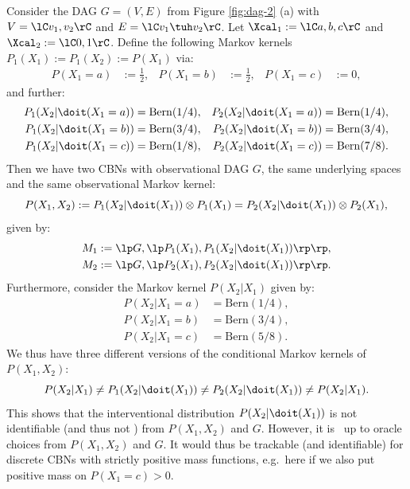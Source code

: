 \begin{Eg}
    Consider the DAG $G=(V,E)$ from Figure \ref{fig:dag-2} (a) with $V=\lC v_1,v_2 \rC$ and $E=\lC v_1\tuh v_2 \rC$.
    Let $\Xcal_{1}:=\lC a,b,c\rC$ and $\Xcal_{2}:=\lC 0,1 \rC$.
    Define the following Markov kernels $P_1(X_{1}) := P_1(X_{2}):=P(X_{1})$ via:
    \begin{align*}
        P(X_{1}=a) &:= \frac{1}{2}, &P(X_{1}=b) &:= \frac{1}{2}, & P(X_{1}=c) &:= 0,
    \end{align*}
    and further:
   \begin{align*}
        P_1(X_{2}|\doit(X_{1}=a)) & =  \mathrm{Bern}(1/4), & P_2(X_{2}|\doit(X_{1}=a)) & =  \mathrm{Bern}(1/4), \\
        P_1(X_{2}|\doit(X_{1}=b)) & =  \mathrm{Bern}(3/4), & P_2(X_{2}|\doit(X_{1}=b)) & =  \mathrm{Bern}(3/4), \\
        P_1(X_{2}|\doit(X_{1}=c)) & =  \mathrm{Bern}(1/8), & P_2(X_{2}|\doit(X_{1}=c)) & =  \mathrm{Bern}(7/8).
    \end{align*}
    Then we have two CBNs with observational DAG $G$, the same underlying spaces 
    and the same observational Markov kernel: 
    \[ P(X_{1},X_{2}) := P_1(X_{2}|\doit(X_{1})) \otimes P_1(X_{1}) = P_2(X_{2}|\doit(X_{1})) \otimes P_2(X_{1}), \]
    given by:
\begin{align*} M_1:=\lp G, \lp P_1(X_{1}),P_1(X_{2}|\doit(X_{1})) \rp \rp, \\
               M_2:=\lp G, \lp P_2(X_{1}),P_2(X_{2}|\doit(X_{1})) \rp \rp. 
\end{align*}
    Furthermore, consider the Markov kernel $P(X_{2}|X_{1})$ given by:
   \begin{align*}
        P(X_{2}|X_{1}=a) & =  \mathrm{Bern}(1/4),\\
        P(X_{2}|X_{1}=b) & =  \mathrm{Bern}(3/4), \\
        P(X_{2}|X_{1}=c) & =  \mathrm{Bern}(5/8).
    \end{align*}
    We thus have three different versions of the conditional Markov kernels of $P(X_{1},X_{2})$: 
 \[ P(X_{2}|X_{1}) \neq P_1(X_{2}|\doit(X_{1})) \neq P_2(X_{2}|\doit(X_{1})) \neq P(X_{2}|X_{1}). \]
 This shows that the interventional distribution $P(X_{2}|\doit(X_{1}))$ is not identifiable (and thus not \trackable) from $P(X_{1},X_{2})$ and  $G$.
 However, it is  \trackable\ up to oracle choices from $P(X_{1},X_{2})$ and $G$.
 It would thus be trackable (and identifiable) for discrete CBNs with strictly positive mass functions, e.g.\ here if
 we also put positive mass on $P(X_{1}=c) > 0$.
\end{Eg}


